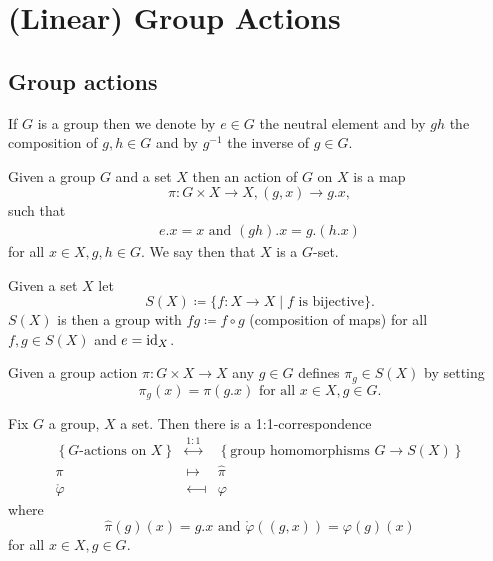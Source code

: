 \chapter{(Linear) Group Actions}





\section{Group actions}


If $G$ is a group then we denote by $e \in G$ the neutral element and by $gh$ the composition of $g,h \in G$ and by $g^{-1}$ the inverse of $g \in G$.


\begin{defi}
 Given a group $G$ and a set $X$ then an action of $G$ on $X$ is a map
 \[
  \pi \colon G \times X \to X, (g,x) \to g.x,
 \]
 such that
 \begin{gather*}
  e.x = x \text{ and }
  (gh).x = g.(h.x)
 \end{gather*}
 for all $x \in X, g,h \in G$. We say then that $X$ is a $G$-set.
\end{defi}


\begin{defi}
 Given a set $X$ let
 \[
  S(X) \coloneqq \{f \colon X \to X \mid f \text{ is bijective}\}.
 \]
 $S(X)$ is then a group with $fg \coloneqq f \circ g$ (composition of maps) for all $f,g \in S(X)$ and $e = \operatorname{id}_X$.
\end{defi}


Given a group action $\pi \colon G \times X \to X$ any  $g \in G$ defines $\pi_g \in S(X)$ by setting
\[
 \pi_g(x) = \pi(g.x) \text{ for all } x \in X, g \in G.
\]


\begin{lem}\label{lem: G-actions = group homos G -> S(X)}
 Fix $G$ a group, $X$ a set. Then there is a 1:1-correspondence
 \[
 \begin{matrix}
    \left\{\text{$G$-actions on $X$}\right\}
  & \overset{1:1}{\longleftrightarrow}
  & \left\{\text{group homomorphisms $G \to S(X)$}\right\} \\
    \pi
  & \longmapsto
  & \hat{\pi} \\
    \mathring{\varphi}
  & \longmapsfrom
  & \varphi
  \end{matrix}
 \]
 where
 \[
  \hat{\pi}(g)(x) = g.x \text{ and } \mathring{\varphi}((g,x)) = \varphi(g)(x)
 \]
 for all $x \in X, g \in G$.
\end{lem}


